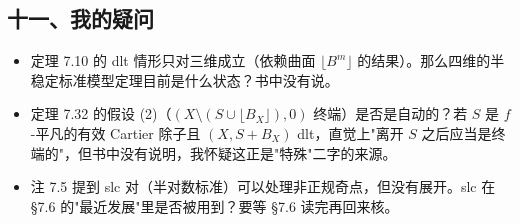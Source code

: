 \subsection*{十一、我的疑问}

\begin{itemize}
\item 定理 7.10 的 dlt 情形只对三维成立（依赖曲面 $\lfloor B^m\rfloor$ 的结果）。那么四维的半稳定标准模型定理目前是什么状态？书中没有说。
\item 定理 7.32 的假设 (2)（$(X\setminus(S\cup\lfloor B_X\rfloor),0)$ 终端）是否是自动的？若 $S$ 是 $f$-平凡的有效 Cartier 除子且 $(X,S+B_X)$ dlt，直觉上"离开 $S$ 之后应当是终端的"，但书中没有说明，我怀疑这正是"特殊"二字的来源。
\item 注 7.5 提到 slc 对（半对数标准）可以处理非正规奇点，但没有展开。slc 在 \S7.6 的"最近发展"里是否被用到？要等 \S7.6 读完再回来核。
\end{itemize}
